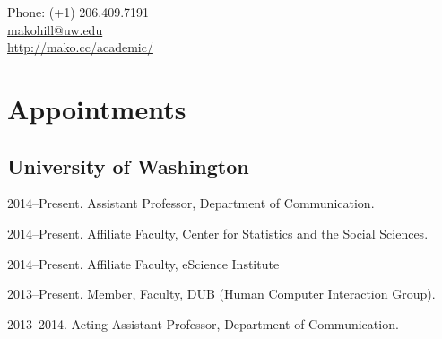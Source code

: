 \documentclass[10pt]{article}
\makeatletter
\def\myemail{makohill@uw.edu}
\def\myweb{http://mako.cc/academic/}
\newenvironment{cvlist}{
\begin{list}{}{\leftmargin=3.0em \itemindent=-3.0em}
  \setlength{\itemsep}{0pt}
  \setlength{\parskip}{0em}
  \setlength{\parsep}{1em}
  \setlength{\parindent}{0em}}
{\vspace{1em}
\end{list}}
\makeatother
\begin{document}
\pagestyle{fancy}
\renewcommand{\headrulewidth}{0pt}
\fancyhead{}
\fancyfoot{}
\rhead{{\scriptsize\thepage}}


\begin{minipage}[t]{3in}
  
\end{minipage}
\hfill     
\begin{minipage}[t]{0.0in}
\end{minipage}
\hfill
\begin{minipage}[t]{1.7in}
  \flushright \footnotesize Phone: (+1) 206.409.7191 \\ 
  \href{mailto:\myemail}{\myemail} \\
  \href{\myweb}{\myweb}
\end{minipage}

\vspace{2em}


\medskip

\section{Appointments}

\subsection{University of Washington}
\begin{cvlist}
\item 2014--Present. Assistant Professor, Department of Communication.
\item 2014--Present. Affiliate Faculty, Center for Statistics and the
  Social Sciences.
\item 2014--Present. Affiliate Faculty, eScience Institute
\item 2013--Present. Member, Faculty, DUB (Human Computer Interaction Group).
\item 2013--2014. Acting Assistant Professor, Department of Communication.
\end{cvlist}
\end{document}
